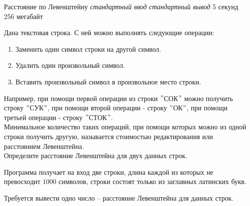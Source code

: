 \begin{problem}%
{Расстояние по Левенштейну}%
{\textsl{стандартный ввод}}%
{\textsl{стандартный вывод}}%
{5 секунд}%
{256 мегабайт}%
{}

Дана текстовая строка. С ней можно выполнять следующие операции:
\begin{enumerate}
\item Заменить один символ строки на другой символ.
\item Удалить один произвольный символ.
\item Вставить произвольный символ в произвольное место строки.
\end{enumerate}

Например, при помощи первой операции из строки $"$СОК$"$ можно получить строку $"$СУК$"$, при помощи второй операции - строку $"$ОК$"$, при помощи третьей операции - строку $"$СТОК$"$.\\

Минимальное количество таких операций, при помощи которых можно из одной строки получить другую, называется стоимостью редактирования или расстоянием Левенштейна.\\

Определите расстояние Левенштейна для двух данных строк.

\InputFile

Программа получает на вход две строки, длина каждой из которых не превосходит $1000$ символов, строки состоят только из заглавных латинских букв.

\OutputFile

Требуется вывести одно число – расстояние Левенштейна для данных строк.

\Examples

\begin{example}
%
\end{example}
\end{problem}
